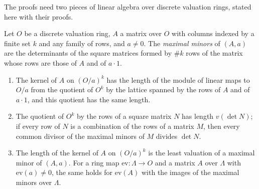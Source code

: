 The proofs need two pieces of linear algebra over discrete valuation rings, stated here with their proofs.

\begin{lemma}\label{lem:sharp-minors}
Let $O$ be a discrete valuation ring, $A$ a matrix over $O$ with columns indexed by a finite set $k$ and any family of rows, and $a\ne0$. The \emph{maximal minors} of $(A,a)$ are the determinants of the square matrices formed by $\#k$ rows of the matrix whose rows are those of $A$ and of $a\cdot1$.
\begin{enumerate}[label=\textup{(\alph*)}]
\item The kernel of $A$ on $(O/a)^k$ has the length of the module of linear maps to $O/a$ from the quotient of $O^k$ by the lattice spanned by the rows of $A$ and of $a\cdot1$, and this quotient has the same length.
\item The quotient of $O^k$ by the rows of a square matrix $N$ has length $v(\det N)$; if every row of $N$ is a combination of the rows of a matrix $M$, then every common divisor of the maximal minors of $M$ divides $\det N$.
\item The length of the kernel of $A$ on $(O/a)^k$ is the least valuation of a maximal minor of $(A,a)$. For a ring map $\mathrm{ev}\colon\Lambda\to O$ and a matrix $A$ over $\Lambda$ with $\mathrm{ev}(a)\ne0$, the same holds for $\mathrm{ev}(A)$ with the images of the maximal minors over $\Lambda$.
\end{enumerate}
\end{lemma}

